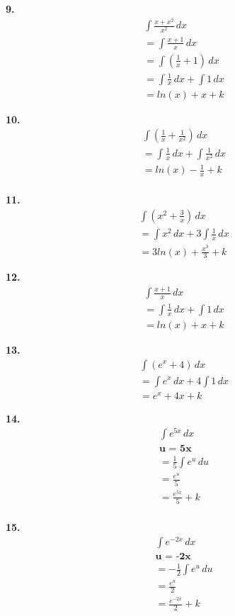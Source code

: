 \documentclass{article}
\begin{document}
\textbf{9.}
\begin{gather*}
    \int \frac{x+x^2}{x^2} \,dx
\\
    = \int \frac{x+1}{x}\,dx
\\
    = \int (\frac{1}{x} + 1)\,dx
\\
    = \int \frac{1}{x}\,dx + \int 1\,dx
\\
    = ln(x) + x + k
\end{gather*}

\textbf{10.}
\begin{gather*}
    \int (\frac{1}{x} + \frac{1}{x^2}) \,dx
\\
    = \int \frac{1}{x}\,dx + \int \frac{1}{x^2}\,dx
\\
    = ln(x) - \frac{1}{x} + k
\\
\end{gather*}

\textbf{11.}
\begin{gather*}
    \int (x^2 + \frac{3}{x})\,dx
\\
    = \int x^2\,dx + 3\int \frac{1}{x}\,dx
\\
    = 3ln(x) + \frac{x^3}{3} + k
\end{gather*}

\textbf{12.}
\begin{gather*}
    \int \frac{x+1}{x}\,dx
\\
    = \int \frac{1}{x}\,dx + \int 1\,dx
\\
    = ln(x) + x + k
\end{gather*}

\textbf{13.}
\begin{gather*}
    \int (e^x + 4)\,dx
\\
    = \int e^x\,dx + 4\int 1\,dx
\\
    = e^x + 4x + k
\end{gather*}

\textbf{14.}
\begin{gather*}
    \int e^{5x}\,dx
\\
    \textbf{u = 5x}
\\
    = \frac{1}{5}\int e^u\,du
\\
    = \frac{e^u}{5}
\\ 
    = \frac{e^{5x}}{5} + k
\\
\end{gather*}

\textbf{15.}
\begin{gather*}
    \int e^{-2x}\,dx
\\
    \textbf{u = -2x}
\\
    = -\frac{1}{2}\int e^u\,du
\\
    = \frac{e^u}{2}
\\ 
    = \frac{e^{-2x}}{2} + k
\\
\end{gather*}
\end{document}
